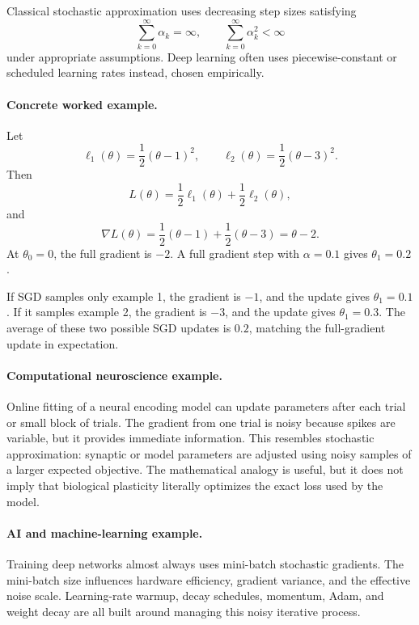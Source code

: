 Classical stochastic approximation uses decreasing step sizes satisfying
\[
\sum_{k=0}^\infty \alpha_k=\infty,
\qquad
\sum_{k=0}^\infty \alpha_k^2<\infty
\]
under appropriate assumptions. Deep learning often uses piecewise-constant or scheduled learning rates instead, chosen empirically.

\paragraph{Concrete worked example.}
Let
\[
\ell_1(\theta)=\frac12(\theta-1)^2,\qquad
\ell_2(\theta)=\frac12(\theta-3)^2.
\]
Then
\[
L(\theta)=\frac12\ell_1(\theta)+\frac12\ell_2(\theta),
\]
and
\[
\nabla L(\theta)=\frac12(\theta-1)+\frac12(\theta-3)=\theta-2.
\]
At \(\theta_0=0\), the full gradient is \(-2\). A full gradient step with \(\alpha=0.1\) gives \(\theta_1=0.2\).

If SGD samples only example 1, the gradient is \(-1\), and the update gives \(\theta_1=0.1\). If it samples example 2, the gradient is \(-3\), and the update gives \(\theta_1=0.3\). The average of these two possible SGD updates is \(0.2\), matching the full-gradient update in expectation.

\paragraph{Computational neuroscience example.}
Online fitting of a neural encoding model can update parameters after each trial or small block of trials. The gradient from one trial is noisy because spikes are variable, but it provides immediate information. This resembles stochastic approximation: synaptic or model parameters are adjusted using noisy samples of a larger expected objective. The mathematical analogy is useful, but it does not imply that biological plasticity literally optimizes the exact loss used by the model.

\paragraph{AI and machine-learning example.}
Training deep networks almost always uses mini-batch stochastic gradients. The mini-batch size influences hardware efficiency, gradient variance, and the effective noise scale. Learning-rate warmup, decay schedules, momentum, Adam, and weight decay are all built around managing this noisy iterative process.

